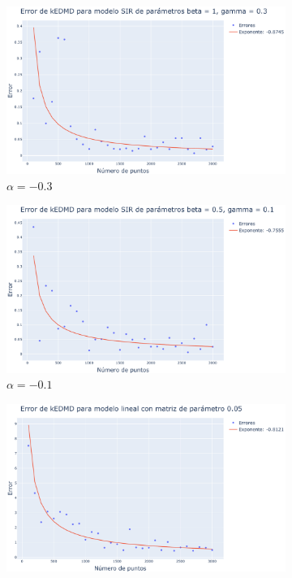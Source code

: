 \begin{figure}[h]
    \centering
    \begin{subfigure}[b]{0.32\textwidth}
        \centering
        \includegraphics[width=\textwidth]{img/content/chapter3/SIR1Errors.pdf}
        \caption{$\alpha=-0.3$}
    \end{subfigure}
    \hfill
    \begin{subfigure}[b]{0.32\textwidth}
        \centering
        \includegraphics[width=\textwidth]{img/content/chapter3/SIR2Errors.pdf}
        \caption{$\alpha=-0.1$}
    \end{subfigure}
    \hfill
    \begin{subfigure}[b]{0.32\textwidth}
        \centering
        \includegraphics[width=\textwidth]{img/content/chapter3/Linear3Errors.pdf}

\end{subfigure}
\end{figure}
